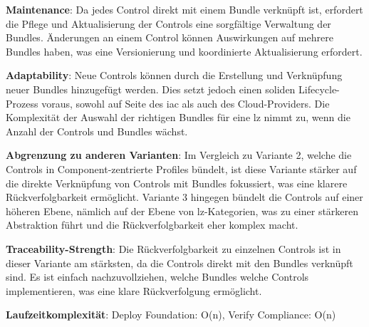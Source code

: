 \textbf{Maintenance}: Da jedes Control direkt mit einem Bundle verknüpft ist, erfordert die Pflege und Aktualisierung der Controls eine sorgfältige Verwaltung der Bundles. Änderungen an einem Control können Auswirkungen auf mehrere Bundles haben, was eine Versionierung und koordinierte Aktualisierung erfordert.

\textbf{Adaptability}: Neue Controls können durch die Erstellung und Verknüpfung neuer Bundles hinzugefügt werden. Dies setzt jedoch einen soliden Lifecycle-Prozess voraus, sowohl auf Seite des \ac{iac} als auch des Cloud-Providers. Die Komplexität der Auswahl der richtigen Bundles für eine \ac{lz} nimmt zu, wenn die Anzahl der Controls und Bundles wächst.

\textbf{Abgrenzung zu anderen Varianten}: Im Vergleich zu Variante 2, welche die Controls in Component-zentrierte Profiles bündelt, ist diese Variante stärker auf die direkte Verknüpfung von Controls mit Bundles fokussiert, was eine klarere Rückverfolgbarkeit ermöglicht. Variante 3 hingegen bündelt die Controls auf einer höheren Ebene, nämlich auf der Ebene von \ac{lz}-Kategorien, was zu einer stärkeren Abstraktion führt und die Rückverfolgbarkeit eher komplex macht.

\textbf{Traceability-Strength}: Die Rückverfolgbarkeit zu einzelnen Controls ist in dieser Variante am stärksten, da die Controls direkt mit den Bundles verknüpft sind. Es ist einfach nachzuvollziehen, welche Bundles welche Controls implementieren, was eine klare Rückverfolgung ermöglicht.

\textbf{Laufzeitkomplexität}: Deploy Foundation: O(n), Verify Compliance: O(n)





